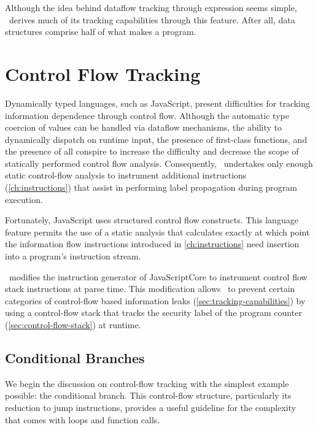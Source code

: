 Although the idea behind dataflow tracking through expression seems simple, \FlowCore\ derives much of its tracking capabilities through this feature.
After all, data structures comprise half of what makes a program\cite{wirth+76}.

\section{Control Flow Tracking}
\label{sec:control-flow-tracking}

Dynamically typed languages, such as JavaScript, present difficulties for tracking information dependence through control flow.
Although the automatic type coercion of values can be handled via dataflow mechanisms, the ability to dynamically dispatch on runtime input, the presence of first-class functions, and the presence of  all conspire to increase the difficulty and decrease the scope of statically performed control flow analysis.
Consequently, \FlowCore\ undertakes only enough static control-flow analysis to instrument additional instructions (\autoref{ch:instructions}) that assist in performing label propagation during program execution.

Fortunately, JavaScript uses structured control flow constructs.
This language feature permits the use of a static analysis that calculates exactly at which point the information flow instructions introduced in \autoref{ch:instructions} need insertion into a program's instruction stream.

\FlowCore\ modifies the instruction generator of JavaScriptCore to instrument control flow stack instructions at parse time.
This modification allows \FlowCore\ to prevent certain categories of control-flow based information leaks (\autoref{sec:tracking-capabilities}) by using a control-flow stack that tracks the security label of the program counter (\autoref{sec:control-flow-stack}) at runtime.


\subsection{Conditional Branches}
\label{sec:conditional-branch}

We begin the discussion on control-flow tracking with the simplest example possible: the conditional branch.
This control-flow structure, particularly its reduction to jump instructions, provides a useful guideline for the complexity that comes with loops and function calls.

